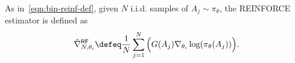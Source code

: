 













\noindent As in~\eqref{eqn:bin-reinf-def}, given $N$ i.i.d. samples of $A_j \sim \pi_\theta$,
the \textsf{REINFORCE} estimator 
is defined as
\begin{align}
\hat{\nabla}^{\mathsf{RF}}_{N,\theta_i}
\defeq 
\frac{1}{N}\sum_{j=1}^N\Big(G(A_j) \nabla_{\theta_i} \log(\pi_\theta(A_j)) \Big).
\label{eqn:eq-def-reinforce}
\end{align}



